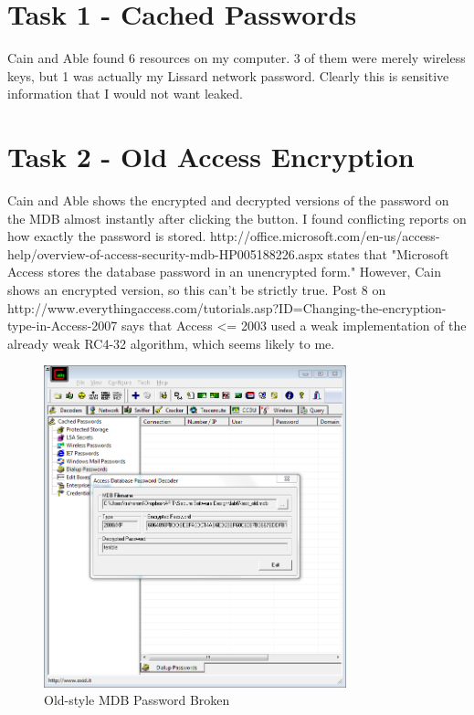 \documentclass{article}
\begin{document}
\pagestyle{fancy}

\section{Task 1 - Cached Passwords}
\par Cain and Able found 6 resources on my computer. 3 of them were merely wireless keys, but 1 was actually my Lissard network password. Clearly this is sensitive information that I would not want leaked.

\section{Task 2 - Old Access Encryption}
\par Cain and Able shows the encrypted and decrypted versions of the password on the MDB almost instantly after clicking the button. I found conflicting reports on how exactly the password is stored. http://office.microsoft.com/en-us/access-help/overview-of-access-security-mdb-HP005188226.aspx states that "Microsoft Access stores the database password in an unencrypted form." However, Cain shows an encrypted version, so this can't be strictly true. Post 8 on http://www.everythingaccess.com/tutorials.asp?ID=Changing-the-encryption-type-in-Access-2007 says that Access <= 2003 used a weak implementation of the already weak RC4-32 algorithm, which seems likely to me.

\begin{figure}[h]
\centering
\includegraphics[width=0.78\textwidth, trim=0pt 150pt 0pt 150pt, clip]{password_broken}
\caption{Old-style MDB Password Broken}
\label{fig:mdbpwd}
\end{figure}
\end{document}
